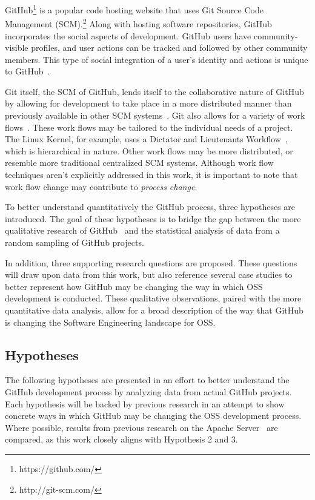 \documentclass{proc}
\begin{document}
GitHub\footnote{https://github.com/} is a popular code hosting website that uses Git Source Code Management (SCM).\footnote{http://git-scm.com/} Along with hosting software repositories, GitHub incorporates the social aspects of development. GitHub users have community-visible profiles, and user actions can be tracked and followed by other community members. This type of social integration of a user's identity and actions is unique to GitHub~\cite{dabbish2012social}. 

Git itself, the SCM of GitHub, lends itself to the collaborative nature of GitHub by allowing for development to take place in a more distributed manner than previously available in other SCM systems~\cite{spinellis2012git}.
Git also allows for a variety of work flows~\cite{chacon2009pro}. These work flows may be tailored to the individual needs of a project. The Linux Kernel, for example, uses a Dictator and Lieutenants Workflow~\cite{platschekfloss}, which is hierarchical in nature. Other work flows may be more distributed, or resemble more traditional centralized SCM systems. Although work flow techniques aren't explicitly addressed in this work, it is important to note that work flow change may contribute to \textit{process change}.

To better understand quantitatively the GitHub process, three hypotheses are introduced. The goal of these hypotheses is to bridge the gap between the more qualitative research of GitHub~\cite{dabbish2012social,begel2013social} and the statistical analysis of data from a random sampling of GitHub projects.

In addition, three supporting research questions are proposed. These questions will draw upon data from this work, but also reference several case studies to better represent how GitHub may be changing the way in which OSS development is conducted. These qualitative observations, paired with the more quantitative data analysis, allow for a broad description of the way that GitHub is changing the Software Engineering landscape for OSS.

\subsection{Hypotheses}
The following hypotheses are presented in an effort to better understand the GitHub development process by analyzing data from actual GitHub projects. Each hypothesis will be backed by previous research in an attempt to show concrete ways in which GitHub may be changing the OSS development process. Where possible, results from previous research on the Apache Server~\cite{mockus2000case} are compared, as this work closely aligns with Hypothesis 2 and 3.\\
\end{document}
